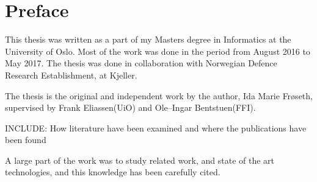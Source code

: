 \chapter*{Preface}                    %
This thesis was written as a part of my Masters degree in Informatics at the University of Oslo. Most of the work was done in the period from August 2016 to May 2017. The thesis was done in collaboration with Norwegian Defence Research Establishment, at Kjeller. 



The thesis is the original and independent work by the author, Ida Marie Fr{\o}seth, supervised by Frank Eliassen(UiO) and Ole--Ingar Bentstuen(FFI). %

INCLUDE: How literature have been examined and where the publications have been found

A large part of the work was to study related work, and state of the art technologies, and this knowledge has been carefully cited. 

